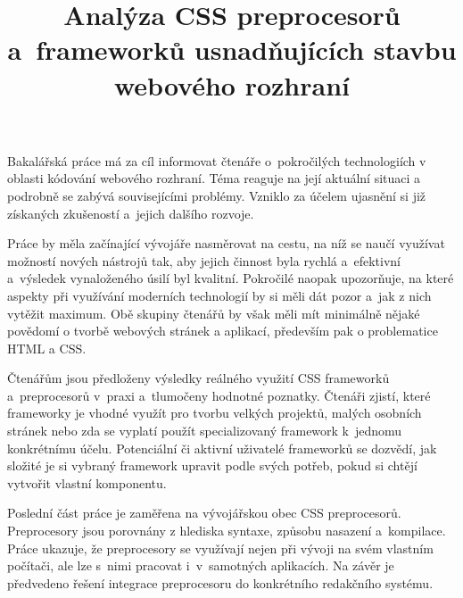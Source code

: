 \documentclass[thesis=B,czech]{FITthesis}[2012/06/26]
\title{Analýza CSS preprocesorů a~frameworků usnadňujících stavbu webového rozhraní}
\begin{document}



\begin{introduction}
	Bakalářská práce má za cíl informovat čtenáře o~pokročilých technologiích v oblasti kódování webového rozhraní. Téma reaguje na její aktuální situaci a podrobně se zabývá souvisejícími problémy. Vzniklo za účelem ujasnění si již získaných zkušeností a~jejich dalšího rozvoje. 

Práce by měla začínající vývojáře nasměrovat na cestu, na níž se naučí využívat možností nových nástrojů tak, aby jejich činnost byla rychlá a~efektivní a~výsledek vynaloženého úsilí byl kvalitní. Pokročilé naopak upozorňuje, na které aspekty při využívání moderních technologií by si měli dát pozor a~jak z nich vytěžit maximum. Obě skupiny čtenářů by však měli mít minimálně nějaké povědomí o tvorbě webových stránek a aplikací, především pak o problematice HTML a CSS.

Čtenářům jsou předloženy výsledky reálného využití CSS frameworků a~preprocesorů v~praxi a~tlumočeny hodnotné poznatky. Čtenáři zjistí, které frameworky je vhodné využít pro tvorbu velkých projektů, malých osobních stránek nebo zda se vyplatí použít specializovaný framework k~jednomu konkrétnímu účelu. Potenciální či aktivní uživatelé frameworků se dozvědí, jak složité je si vybraný framework upravit podle svých potřeb, pokud si chtějí vytvořit vlastní komponentu. 

Poslední část práce je zaměřena na vývojářskou obec CSS preprocesorů. Preprocesory jsou porovnány z hlediska syntaxe, způsobu nasazení a~kompilace. Práce ukazuje, že preprocesory se využívají nejen při vývoji na svém vlastním počítači, ale lze s~nimi pracovat i~v~samotných aplikacích. Na závěr je předvedeno řešení integrace preprocesoru do konkrétního redakčního systému. 

\end{introduction}
\end{document}
